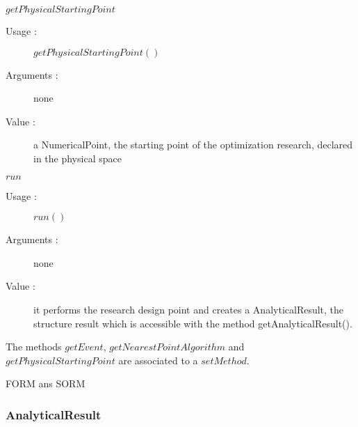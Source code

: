 \begin{description}
\begin{description}
  \item $getPhysicalStartingPoint$
    \begin{description}
    \item[Usage :] $getPhysicalStartingPoint()$
    \item[Arguments :] none
    \item[Value :]  a NumericalPoint, the starting point of the optimization research, declared in the physical space
    \end{description}
    \bigskip

  \item $run$
    \begin{description}
    \item[Usage :] $run()$
    \item[Arguments :] none
    \item[Value :]  it performs the research design point and creates a AnalyticalResult, the structure result which is accessible with the method getAnalyticalResult().
    \end{description}
    \bigskip

  \end{description}
  The methods $getEvent$, $getNearestPointAlgorithm$ and $getPhysicalStartingPoint$ are associated to a $setMethod$.

\item[Derivative Classes :] FORM ans SORM

\end{description}



\newpage \subsubsection{AnalyticalResult}

